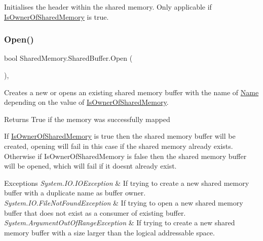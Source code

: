 Initialises the header within the shared memory. Only applicable if \hyperlink{class_shared_memory_1_1_shared_buffer_a3cd1658c35b0a9234faf1e65eba5088e}{Is\+Owner\+Of\+Shared\+Memory} is true. 

\mbox{\label{class_shared_memory_1_1_shared_buffer_abf7e37d0b654ad76bcfca63543766445}} 
\subsubsection{\texorpdfstring{Open()}{Open()}}
{\footnotesize\ttfamily bool Shared\+Memory.\+Shared\+Buffer.\+Open (\begin{DoxyParamCaption}{ }\end{DoxyParamCaption})\hspace{0.3cm}{\ttfamily [inline]}, {\ttfamily [protected]}}



Creates a new or opens an existing shared memory buffer with the name of \hyperlink{class_shared_memory_1_1_shared_buffer_ada2e0253ecaba264da7f2855a02e9ccc}{Name} depending on the value of \hyperlink{class_shared_memory_1_1_shared_buffer_a3cd1658c35b0a9234faf1e65eba5088e}{Is\+Owner\+Of\+Shared\+Memory}. 

\begin{DoxyReturn}{Returns}
True if the memory was successfully mapped
\end{DoxyReturn}


If \hyperlink{class_shared_memory_1_1_shared_buffer_a3cd1658c35b0a9234faf1e65eba5088e}{Is\+Owner\+Of\+Shared\+Memory} is true then the shared memory buffer will be created, opening will fail in this case if the shared memory already exists. Otherwise if Is\+Owner\+Of\+Shared\+Memory is false then the shared memory buffer will be opened, which will fail if it doesn\textquotesingle{}t already exist.


\begin{DoxyExceptions}{Exceptions}
{\em System.\+I\+O.\+I\+O\+Exception} & If trying to create a new shared memory buffer with a duplicate name as buffer owner.\\
\hline
{\em System.\+I\+O.\+File\+Not\+Found\+Exception} & If trying to open a new shared memory buffer that does not exist as a consumer of existing buffer.\\
\hline
{\em System.\+Argument\+Out\+Of\+Range\+Exception} & If trying to create a new shared memory buffer with a size larger than the logical addressable space.\\
\hline
\end{DoxyExceptions}
\mbox{\label{class_shared_memory_1_1_shared_buffer_a95407dfdc38af1afeeb9a9c4a8569982}} 
